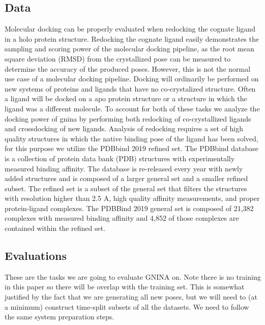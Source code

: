\documentclass[journal=jcisd8,manuscript=article]{achemso}
\begin{document}
\subsection{Data}
Molecular docking can be properly evaluated when redocking the cognate ligand in a holo protein structure. Redocking the cognate ligand easily demonstrates the sampling and scoring power of the molecular docking pipeline, as the root mean square deviation (RMSD) from the crystallized pose can be measured to determine the accuracy of the produced poses. However, this is not the normal use case of a molecular docking pipeline.  Docking will ordinarily be performed on new systems of proteins and ligands that have no co-crystalized structure. Often a ligand will be docked on a apo protein structure or a structure in which the ligand was a different molecule. To account for both of these tasks we analyze the docking power of gnina by performing both redocking of co-crystallized ligands and crossdocking of new ligands. Analysis of redocking requires a set of high quality structures in which the native binding pose of the ligand has been solved, for this purpose we utilize the PDBbind 2019 refined set. The PDBbind database is a collection of protein data bank (PDB) structures with experimentally measured binding affinity. The database is re-released every year with newly added structures and is composed of a larger general set and a smaller refined subset. The refined set is a subset of the general set that filters the structures with resolution higher than 2.5 A, high quality affinity measurements, and proper protein-ligand complexes.  The PDBBind 2019 general set is composed of 21,382 complexes with measured binding affinity and 4,852 of those complexes are contained within the refined set.

\subsection{Evaluations}
These are the tasks we are going to evaluate GNINA on.  Note there is no training in this paper so there will be overlap with the training set.  This is somewhat justified by the fact that we are generating all new poses, but we will need to (at a minimum) construct time-split subsets of all the datasets.  We need to follow the same system preparation steps.
\end{document}
